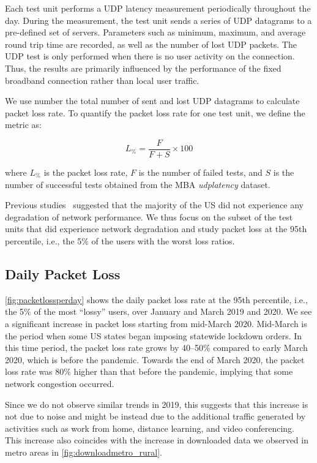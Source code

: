 Each test unit performs a \gls{UDP} latency measurement periodically throughout the day. During the measurement, the test unit sends a series of \gls{UDP} datagrams to a pre-defined set of servers. Parameters such as minimum, maximum, and average round  trip time are recorded, as well as the number of lost \gls{UDP} packets. The \gls{UDP} test is only performed when there is no user activity on the connection. Thus, the results are primarily influenced by the performance of the fixed broadband connection rather than local user traffic.

We use number the total number of sent and lost \gls{UDP} datagrams to calculate packet loss rate. To quantify the packet loss rate for one test unit, we define the metric as:

\begin{equation}
    L_\% = \frac{ F }{ F + S } \times 100
\end{equation}

where $L_\%$ is the packet loss rate, $F$ is the number of failed tests, and $S$ is the number of successful tests obtained from the \gls{MBA} \textit{udplatency} dataset.

Previous studies~\cite{kovacs} suggested that the majority of the \gls{US} did not experience any degradation of network performance. We thus focus on the subset of the test units that did experience network degradation and study packet loss at the 95th percentile, i.e., the 5\% of the users with the worst loss ratios.

\subsection{Daily Packet Loss}

\cref{fig:packetlossperday} shows the daily packet loss rate at the 95th percentile, i.e., the 5\% of the most ``lossy'' users,  over January and March 2019 and 2020. We see a significant increase in packet loss starting from mid-March 2020. Mid-March is the period when some \gls{US} states began imposing statewide lockdown orders. In this time period, the packet loss rate grows by 40--50\% compared to early March 2020, which is before the pandemic. Towards the end of March 2020, the packet loss rate was 80\% higher than that before the pandemic, implying that some network congestion occurred.

Since we do not observe similar trends in 2019, this suggests that this increase is not due to noise and might be instead due to the additional traffic generated by activities such as work from home, distance learning, and video conferencing. This increase also coincides with the increase in downloaded data we observed in metro areas in \cref{fig:downloadmetro_rural}.

